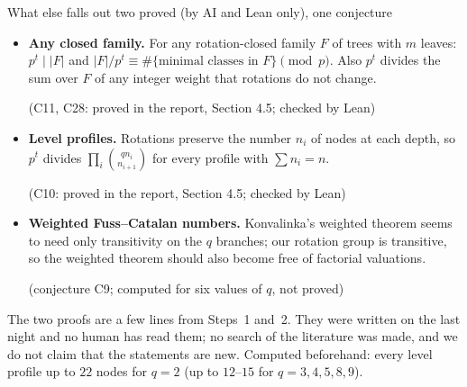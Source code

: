 \documentclass[aspectratio=169,11pt]{beamer}
\begin{document}
\begin{frame}{What else falls out \hfill\normalsize\textcolor{red!70!black}{two proved (by AI and Lean only), one conjecture}}
  \begin{itemize}
    \item \textbf{Any closed family.}
      For any rotation-closed family $F$ of trees with $m$ leaves:
      $p^t\mid|F|$ and $|F|/p^t\equiv\#\{\text{minimal classes in }F\}\pmod p$.
      Also $p^t$ divides the sum over $F$ of any integer weight that rotations do not change.
      \par\hfill{\small(C11, C28: proved in the report, Section 4.5; checked by Lean)}
    \item \textbf{Level profiles.}
      Rotations preserve the number $n_i$ of nodes at each depth, so $p^t$
      divides $\prod_i\binom{q n_i}{n_{i+1}}$ for every profile with $\sum n_i=n$.
      \par\hfill{\small(C10: proved in the report, Section 4.5; checked by Lean)}
    \item \textbf{Weighted Fuss--Catalan numbers.}
      Konvalinka's weighted theorem seems to need only transitivity on the $q$
      branches; our rotation group is transitive, so the weighted theorem should
      also become free of factorial valuations.
      \par\hfill{\small(conjecture C9; computed for six values of $q$, not proved)}
  \end{itemize}
  \vfill
  {\small The two proofs are a few lines from Steps~1 and~2. They were written on the last night and no
  human has read them; no search of the literature was made, and we do not claim that the statements are new.
  Computed beforehand: every level profile up to $22$ nodes for $q=2$ (up to $12$--$15$ for $q=3,4,5,8,9$).}
\end{frame}
\end{document}
